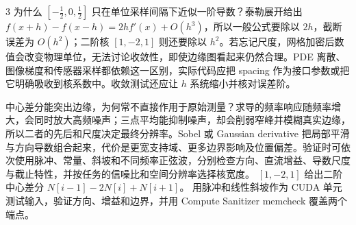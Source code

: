 \begin{solutionexercise}{3}
为什么 $[-\tfrac12,0,\tfrac12]$ 只在单位采样间隔下近似一阶导数？泰勒展开给出 $f(x+h)-f(x-h)=2hf'(x)+O(h^3)$，所以一般公式要除以 $2h$，截断误差为 $O(h^2)$；二阶核 $[1,-2,1]$ 则还要除以 $h^2$。若忘记尺度，网格加密后数值会改变物理单位，无法讨论收敛性，即使边缘图看起来仍然合理。PDE 离散、图像梯度和传感器采样都依赖这一区别，实际代码应把 spacing 作为接口参数或把它明确吸收到核系数中。收敛测试还应让 $h$ 系统缩小并核对误差阶。

中心差分能突出边缘，为何常不直接作用于原始测量？求导的频率响应随频率增大，会同时放大高频噪声；三点平均能抑制噪声，却会削弱窄峰并模糊真实边缘，所以二者的先后和尺度决定最终分辨率。Sobel 或 Gaussian derivative 把局部平滑与方向导数组合起来，代价是更宽支持域、更多边界影响及位置偏差。验证时可依次使用脉冲、常量、斜坡和不同频率正弦波，分别检查方向、直流增益、导数尺度与截止特性，并按任务的信噪比和空间分辨率选择核宽度。
\variantheading $[1,-2,1]$ 给出二阶中心差分 $N[i-1]-2N[i]+N[i+1]$。
\practiceheading 用脉冲和线性斜坡作为 CUDA 单元测试输入，验证方向、增益和边界，并用 Compute Sanitizer memcheck 覆盖两个端点。
\end{solutionexercise}

